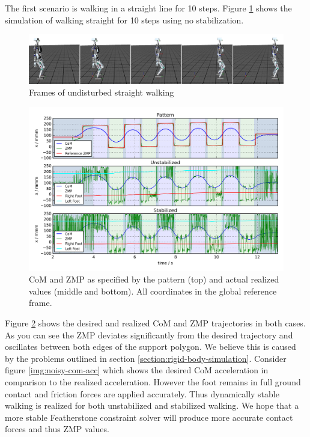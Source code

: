 \documentclass[english,ngerman]{KITreprt}
\begin{document}
The first scenario is walking in a straight line for 10 steps. Figure
\ref{img:player-undisturbed-straight-thumbs} shows the simulation of
walking straight for 10 steps using no stabilization.

\begin{figure}[H]
\vspace*{-1em}
\includegraphics[width=\textwidth]{images/undisturbed_straight_thumbs.png}
\caption{Frames of undisturbed straight walking}
\label{img:player-undisturbed-straight-thumbs}
\end{figure}

\begin{figure}[H]
\vspace*{-1em}
\includegraphics[width=\textwidth,resolution=300]{images/undisturbed_straight_x.png}
\caption{CoM and ZMP as specified by the pattern (top) and actual realized values (middle and bottom).
All coordinates in the global reference frame.}
\label{img:undisturbed-straight-x}
\end{figure}

Figure \ref{img:undisturbed-straight-x} shows the desired and realized
CoM and ZMP trajectories in both cases. As you can see the ZMP deviates
significantly from the desired trajectory and oscillates between both
edges of the support polygon. We believe this is caused by the problems
outlined in section \ref{section:rigid-body-simulation}. Consider figure
\ref{img:noisy-com-acc} which shows the desired CoM acceleration in
comparison to the realized acceleration. However the foot remains in
full ground contact and friction forces are applied accurately. Thus
dynamically stable walking is realized for both unstabilized and
stabilized walking. We hope that a more stable Featherstone constraint
solver will produce more accurate contact forces and thus ZMP values.
\end{document}
